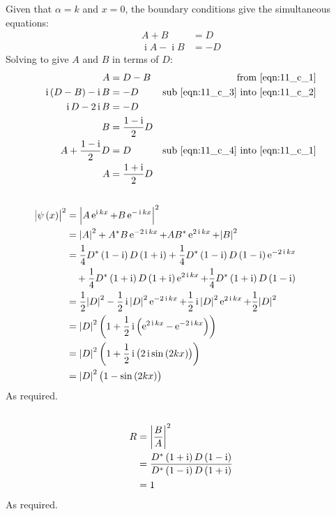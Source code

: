 Given that $ \alpha = k $ and $ x = 0 $, the boundary conditions give the simultaneous equations:
\begin{align}
    A + B & = D \label{eqn:11_c_1}\\
    \operatorname{i} A - \operatorname{i} B & = -D \label{eqn:11_c_2}
\end{align}
Solving to give $ A $ and $ B $ in terms of $ D $:
\begin{align}
    A & = D - B \label{eqn:11_c_3} & \textrm{from \eqref{eqn:11_c_1}}\\
    \operatorname{i} \del{D - B} - \operatorname{i}B & = - D \notag & \textrm{sub \eqref{eqn:11_c_3} into \eqref{eqn:11_c_2}}\\
    \operatorname{i}D - 2 \operatorname{i}B & = -D \notag\\
    B & = \frac{1 - \operatorname{i}}{2} D \label{eqn:11_c_4}\\
    A + \frac{1 - \operatorname{i}}{2} D & = D \notag & \textrm{sub \eqref{eqn:11_c_4} into \eqref{eqn:11_c_1}}\\
    A & = \frac{1 + \operatorname{i}}{2} D \label{eqn:11_c_5}
\end{align}

\subsection{}
\begin{align*}
    \mathllap{\abs{\psi \del{x}}^2} & = \abs{A \operatorname{e}^{\operatorname{i}kx} + B\operatorname{e}^{-\operatorname{i}kx}}^2\\
    & = \abs{A}^2 + A^*B \operatorname{e}^{-2 \operatorname{i} kx} + AB^* \operatorname{e}^{2 \operatorname{i} kx} + \abs{B}^2\\
    & = \frac{1}{4} D^* \del{1 - \operatorname{i}} D \del{1 + \operatorname{i}} + \frac{1}{4} D^* \del{1 - \operatorname{i}} D \del{1 - \operatorname{i}} \operatorname{e}^{-2 \operatorname{i} kx}\\
    & \quad + \frac{1}{4} D^* \del{1 + \operatorname{i}} D \del{1 + \operatorname{i}} \operatorname{e}^{2 \operatorname{i} kx} + \frac{1}{4} D^* \del{1 + \operatorname{i}} D \del{1 - \operatorname{i}}\\
    & = \frac{1}{2} \abs{D}^2 - \frac{1}{2} \operatorname{i} \abs{D}^2 \operatorname{e}^{-2 \operatorname{i} kx} + \frac{1}{2} \operatorname{i} \abs{D}^2 \operatorname{e}^{2 \operatorname{i} kx} + \frac{1}{2} \abs{D}^2\\
    & = \abs{D}^2 \del{1 + \frac{1}{2} \operatorname{i} \del{\operatorname{e}^{2 \operatorname{i} kx} - \operatorname{e}^{-2 \operatorname{i} kx}}}\\
    & = \abs{D}^2 \del{1 + \frac{1}{2} \operatorname{i} \del{2 \operatorname{i} \sin{\del{2kx}}}}\\
    & = \abs{D}^2 \del{1 - \sin{\del{2kx}}}
\end{align*}
As required.

\subsection{}
\begin{align*}
    R & = \abs{\frac{B}{A}}^2\\
    & = \frac{D^* \del{1 + \operatorname{i}} D \del{1 - \operatorname{i}}}{D^* \del{1 - \operatorname{i}} D \del{1 + \operatorname{i}}}\\
    & = 1
\end{align*}
As required.

